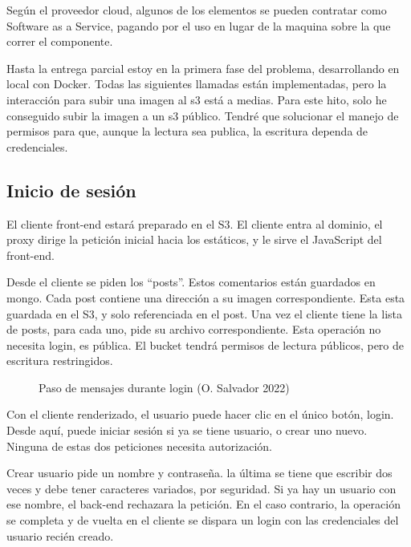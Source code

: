 \documentclass[11pt]{article}
\begin{document}
\begin{flushleft}
Según el proveedor cloud, algunos de los elementos se pueden contratar como Software as a Service, pagando por el uso en lugar de la maquina sobre la que correr el componente.  
\linebreak
 

Hasta la entrega parcial estoy en la primera fase del problema, desarrollando en local con Docker. Todas las siguientes llamadas están implementadas, pero la interacción para subir una imagen al s3 está a medias. Para este hito, solo he conseguido subir la imagen a un s3 público. Tendré que solucionar el manejo de permisos para que, aunque la lectura sea publica, la escritura dependa de credenciales. 


	\subsection{Inicio de sesión}
		El cliente front-end estará preparado en el S3. El cliente entra al dominio, el proxy dirige la petición inicial hacia los estáticos, y le sirve el JavaScript del front-end.
		\linebreak
		
		Desde el cliente se piden los ``posts''. Estos comentarios están guardados en mongo. Cada post contiene una dirección a su imagen correspondiente. Esta esta guardada en el S3, y solo referenciada en el post. Una vez el cliente tiene la lista de posts, para cada uno, pide su archivo correspondiente. Esta operación no necesita login, es pública. El bucket tendrá permisos de lectura públicos, pero de escritura restringidos.  
		\linebreak
		
			\begin{figure}[htb]
				\centering
				\caption{Paso de mensajes durante login (O. Salvador 2022)}
			\end{figure}	
	
		Con el cliente renderizado, el usuario puede hacer clic en el único botón, login. Desde aquí, puede iniciar sesión si ya se tiene usuario, o crear uno nuevo. Ninguna de estas dos peticiones necesita autorización.  
		\linebreak
		

		Crear usuario pide un nombre y contraseña. la última se tiene que escribir dos veces y debe tener caracteres variados, por seguridad. Si ya hay un usuario con ese nombre, el back-end rechazara la petición. En el caso contrario, la operación se completa y de vuelta en el cliente se dispara un login con las credenciales del usuario recién creado. 
		\linebreak
		

\end{flushleft}
\end{document}
